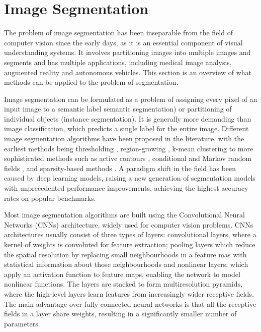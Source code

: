 \documentclass[a4paper,twoside,12pt]{book}
\begin{document}
\section{Image Segmentation}
\label{sec:chapter2.3}
The problem of image segmentation has been inseparable from the field of computer vision since the early days, as it is an essential component of visual understanding systems. It involves partitioning images into multiple images and segments and has multiple applications, including medical image analysis, augmented reality and autonomous vehicles. This section is an overview of what methods can be applied to the problem of segmentation. %

Image segmentation can be formulated as a problem of assigning every pixel of an input image to a semantic label semantic segmentation) or partitioning of individual objects (instance segmentation). It is generally more demanding than image classification, which predicts a single label for the entire image. Different image segmentation algorithms have been proposed in the literature, with the earliest methods being thresholding \cite{otsu1979threshold}, region-growing \cite{nock2004statistical}, k-mean clustering \cite{dhanachandra2015image} to more sophisticated methods such as active contours \cite{kass1988snakes}, conditional and Markov random fields \cite{plath2009multi}, and sparsity-based methods \cite{starck2005image}. A paradigm shift in the field has been caused by deep learning models, raising a new generation of segmentation models with unprecedented performance improvements, achieving the highest accuracy rates on popular benchmarks.

Most image segmentation algorithms are built using the Convolutional Neural Networks (CNNs) architecture, widely used for computer vision problems. CNNs architectures usually consist of three types of layers: convolutional layers, where a kernel of weights is convoluted for feature extraction; pooling layers which reduce the spatial resolution by replacing small neighbourhoods in a feature mas with statistical information about those neighbourhoods and nonlinear layers; which apply an activation function to feature maps, enabling the network to model nonlinear functions. The layers are stacked to form multiresolution pyramids, where the high-level layers learn features from increasingly wider receptive fields. The main advantage over fully-connected neural networks is that all the receptive fields in a layer share weights, resulting in a significantly smaller number of parameters.
\end{document}
